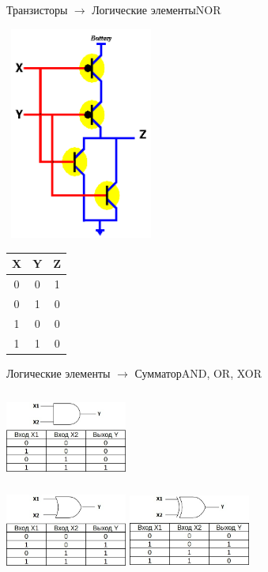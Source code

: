 \begin{frame}[fragile]{Транзисторы $\rightarrow$ Логические элементы}{NOR}
\begin{multicols}{2}
\includegraphics[width=5cm, height=7cm]{Term_1/Source/Pirctures/nor-circuit.png}
\vfill\eject
\begin{tabular}{ c|c|c }
X &	Y & Z \\ 
  \hline
0 & 0 & 1\\
  \hline
0 & 1 & 0 \\
 \hline
1 & 0 & 0 \\
 \hline
1 & 1 & 0 \\
\end{tabular}
\end{multicols}
\end{frame}

\begin{frame}[fragile]{Логические элементы $\rightarrow$ Сумматор}{AND, OR, XOR}
\begin{multicols}{2}
\includegraphics[width=4cm, height=3cm]{Term_1/Source/Pirctures/and.jpg}\\
\includegraphics[width=4cm, height=3cm]{Term_1/Source/Pirctures/or.jpg}
\vfill\eject
\includegraphics[width=4cm, height=3cm]{Term_1/Source/Pirctures/xor.jpg}
\end{multicols}
\end{frame}


